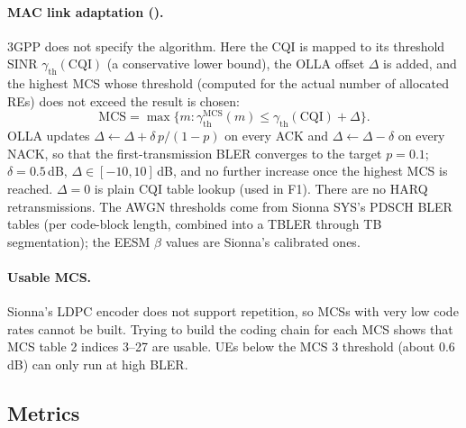 \documentclass[11pt,a4paper]{article}
\DeclareRobustCommand{\code}[1]{\codeurl{#1}}  %
\newcommand{\dB}{\,dB}
\begin{document}
\paragraph{MAC link adaptation (\code{link_adaptation.py}).} 3GPP does not specify the algorithm. Here the CQI is mapped to its
threshold SINR $\gamma_{\mathrm{th}}(\mathrm{CQI})$ (a conservative lower bound), the OLLA offset $\Delta$ is added, and the
highest MCS whose threshold (computed for the actual number of allocated REs) does not exceed the result is chosen:
\begin{equation}
  \mathrm{MCS} = \max\{ m : \gamma_{\mathrm{th}}^{\mathrm{MCS}}(m) \le \gamma_{\mathrm{th}}(\mathrm{CQI}) + \Delta \}.
\end{equation}
OLLA updates $\Delta \leftarrow \Delta + \delta\, p/(1-p)$ on every ACK and $\Delta \leftarrow \Delta - \delta$ on every NACK, so
that the first-transmission BLER converges to the target $p = 0.1$; $\delta = 0.5$\dB, $\Delta \in [-10, 10]$\dB, and no further
increase once the highest MCS is reached. $\Delta = 0$ is plain CQI table lookup (used in F1). There are no HARQ retransmissions.
The AWGN thresholds come from Sionna SYS's PDSCH BLER tables (per code-block length, combined into a TBLER through TB
segmentation); the EESM $\beta$ values are Sionna's calibrated ones.

\paragraph{Usable MCS.} Sionna's LDPC encoder does not support repetition, so MCSs with very low code rates cannot be built.
Trying to build the coding chain for each MCS shows that MCS table 2 indices 3--27 are usable. UEs below the MCS 3 threshold
(about 0.6\dB) can only run at high BLER.

\subsection{Metrics}
\end{document}
